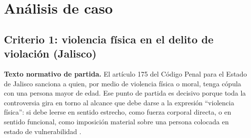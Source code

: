 \documentclass[
	spanish,
	letterpaper, oneside
]{article}
\begin{document}
%
%

\section{Análisis de caso}

\subsection{Criterio 1: violencia física en el delito de violación (Jalisco)}

\textbf{Texto normativo de partida.} El artículo 175 del Código Penal para el Estado de Jalisco sanciona a quien, por medio de violencia física o moral, tenga cópula con una persona mayor de edad. Ese punto de partida es decisivo porque toda la controversia gira en torno al alcance que debe darse a la expresión \enquote{violencia física}: si debe leerse en sentido estrecho, como fuerza corporal directa, o en sentido funcional, como imposición material sobre una persona colocada en estado de vulnerabilidad \citep{scjnViolenciaFisica2022}.
\end{document}
